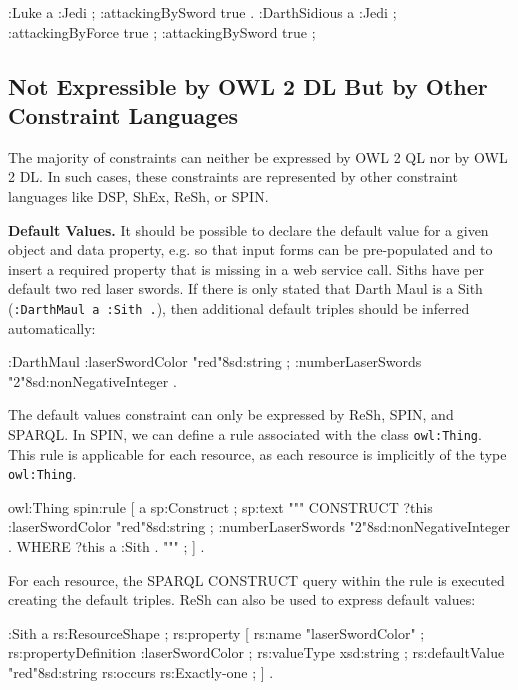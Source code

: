\documentclass{llncs}
\newcommand{\ms}[1]{\texttt{#1}}
\begin{document}
\begin{ex}
:Luke
    a :Jedi ; 
    :attackingBySword true .
:DarthSidious
    a :Jedi ; 
    :attackingByForce true ;
    :attackingBySword true ;
\end{ex}

\subsection{Not Expressible by OWL 2 DL But by Other Constraint Languages}

The majority of constraints can neither be expressed by OWL 2 QL nor by OWL 2 DL. 
In such cases, these constraints are represented by other constraint languages like DSP, ShEx, ReSh, or SPIN.

\textbf{Default Values.}
It should be possible to declare the default value for a given object and data property, e.g. so that input forms can be pre-populated and to insert a required property that is missing in a web service call. 
Siths have per default two red laser swords.
If there is only stated that Darth Maul is a Sith (\ms{:DarthMaul a :Sith .}), then additional default triples should be inferred automatically: 

\begin{ex}
:DarthMaul 
    :laserSwordColor "red"^^xsd:string ;
    :numberLaserSwords "2"^^xsd:nonNegativeInteger .
\end{ex}

The default values constraint can only be expressed by ReSh, SPIN, and SPARQL.
In SPIN, we can define a rule associated with the class \ms{owl:Thing}.
This rule is applicable for each resource, as each resource is implicitly of the type \ms{owl:Thing}. 

\begin{ex}
owl:Thing spin:rule [ a sp:Construct ; sp:text """
    CONSTRUCT {
        ?this :laserSwordColor "red"^^xsd:string ;
              :numberLaserSwords "2"^^xsd:nonNegativeInteger . }
    WHERE {             
        ?this a :Sith . } """ ; ] .
\end{ex}

For each resource, the SPARQL CONSTRUCT query within the rule is executed creating the default triples.
ReSh can also be used to express default values:

\begin{ex}
:Sith a rs:ResourceShape ;
    rs:property [
        rs:name "laserSwordColor" ;
        rs:propertyDefinition :laserSwordColor ;
        rs:valueType xsd:string ;
        rs:defaultValue "red"^^xsd:string
        rs:occurs rs:Exactly-one ; ] .
\end{ex}
\end{document}
